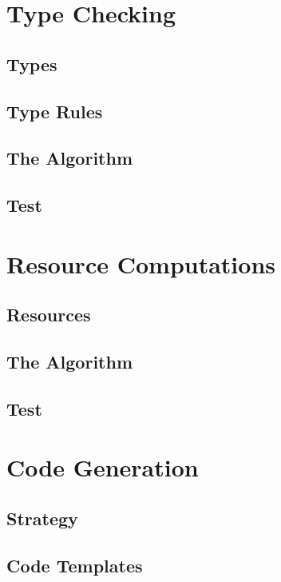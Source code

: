 \documentclass[a4paper,10pt,titlepage]{report}
\begin{document}
\section{Type Checking}

\subsection{Types}

\subsection{Type Rules}

\subsection{The Algorithm}

\subsection{Test}

\section{Resource Computations}

\subsection{Resources}

\subsection{The Algorithm}

\subsection{Test}

\section{Code Generation}

\subsection{Strategy}

\subsection{Code Templates}
\end{document}
